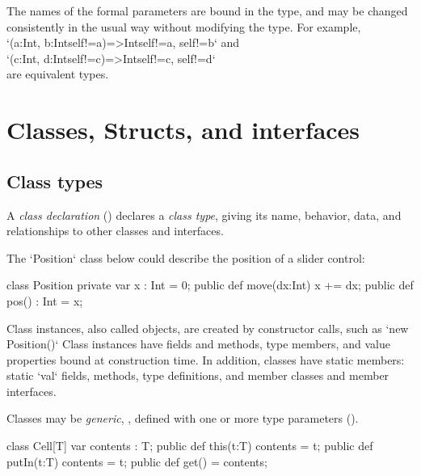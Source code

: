 The names of the formal parameters are bound in the type, and may be changed
consistently in the usual way without modifying the type.  
For example, \\
\xcd`(a:Int, b:Int{self!=a})=>Int{self!=a, self!=b}` 
and \\
\xcd`(c:Int, d:Int{self!=c})=>Int{self!=c, self!=d}` \\
are equivalent types.  



\section{Classes, Structs,  and interfaces}
\label{ReferenceTypes}

\subsection{Class types}


A {\em class declaration} () declares a {\em class type},
giving its name, behavior, data, and relationships to other classes and
interfaces. 

\begin{ex}
The \xcd`Position` class below could describe the position of a slider
control: 
\begin{xten}
class Position {
  private var x : Int = 0;
  public def move(dx:Int) { x += dx; }
  public def pos() : Int = x;
}
\end{xten}
%
\end{ex}
Class instances, also called objects, are created by constructor calls, 
such as \xcd`new Position()`
Class
instances have fields and methods, type members, and value properties bound at
construction time. In addition, classes have static members: static \xcd`val` fields,
methods, type definitions, and member classes and member interfaces.

Classes may be {\em generic}, \ie, defined with one or more type
parameters ().  

\begin{xten}
class Cell[T] {
  var contents : T;
  public def this(t:T) { contents = t;  }
  public def putIn(t:T) { contents = t; }
  public def get() = contents;
  }
\end{xten}


